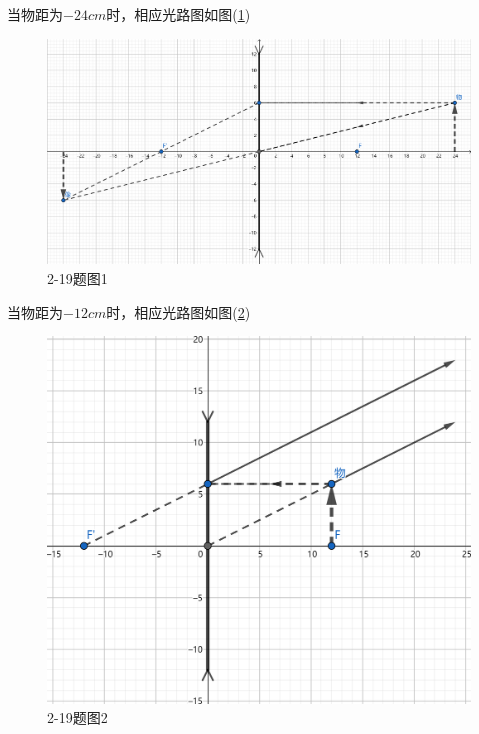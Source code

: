 \documentclass[10pt,a4paper]{article}
\theoremstyle{remark}
\begin{document}
当物距为$-24cm$时，相应光路图如图(\ref{FigureofProblem2-19_1})
\begin{figure}
\centering
\includegraphics[scale=.2]{OpticsHomework_2_2-19_1(tailored).png}
\caption{2-19题图1}\label{FigureofProblem2-19_1}
\end{figure}

当物距为$-12cm$时，相应光路图如图(\ref{FigureofProblem2-19_2})
\begin{figure}
\centering
\includegraphics[scale=.2]{OpticsHomework_2_2-19_2(tailored).png}
\caption{2-19题图2}\label{FigureofProblem2-19_2}
\end{figure}
\end{document}
